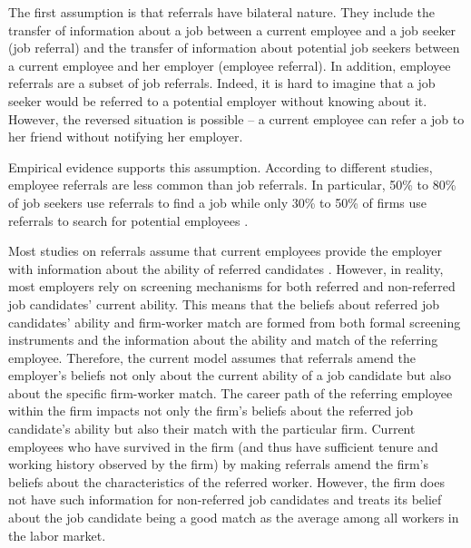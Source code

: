 \documentclass[12pt]{article}
\begin{document}
The first assumption is that referrals have bilateral nature. They include the transfer of information about a job between a current employee and a job seeker (job referral) and the transfer of information about potential job seekers between a current employee and her employer (employee referral). In addition, employee referrals are a subset of job referrals. Indeed, it is hard to imagine that a job seeker would be referred to a potential employer without knowing about it. However, the reversed situation is possible – a current employee can refer a job to her friend without notifying her employer. 

Empirical evidence supports this assumption. According to different studies, employee referrals are less common than job referrals. In particular,  50\% to 80\% of job seekers use referrals to find a job  \citep{lin1981social, elliott1999social} while only 30\% to 50\% of firms use referrals to search for potential employees \citep{neckerman1991hiring, holzer1987hiring}.

Most studies on referrals assume that current employees provide the employer with information about the ability of referred candidates \citep{lester2021heterogeneous, ekinci2016employee, beaman2012gets}. However, in reality, most employers rely on screening mechanisms for both referred and non-referred job candidates' current ability. This means that the beliefs about referred job candidates' ability and firm-worker match are formed from both formal screening instruments and the information about the ability and match of the referring employee. Therefore, the current model assumes that referrals amend the employer's beliefs not only about the current ability of a job candidate but also about the specific firm-worker match. The career path of the referring employee within the firm impacts not only the firm's beliefs about the referred job candidate's ability but also their match with the particular firm. Current employees who have survived in the firm (and thus have sufficient tenure and working history observed by the firm) by making referrals amend the firm's beliefs about the characteristics of the referred worker. However, the firm does not have such information for non-referred job candidates and treats its belief about the job candidate being a good match as the average among all workers in the labor market.

\end{document}
